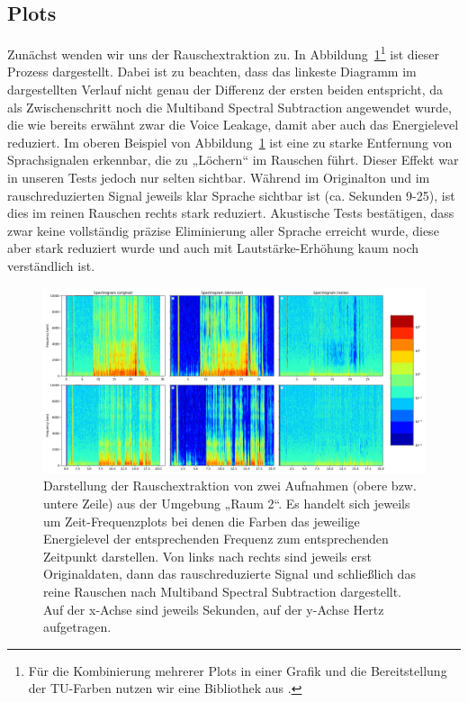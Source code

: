 \documentclass[
	fontsize=10.5pt,
	marginpar=false,
	ngerman,
	accentcolor=3d
	]{tudapub}
\begin{document}
\pagebreak
\subsection{Plots}
\label{plots}

Zunächst wenden wir uns der Rauschextraktion zu. In Abbildung~\ref{fig:denoise}\footnote{Für die Kombinierung mehrerer Plots in einer Grafik und die Bereitstellung der TU-Farben nutzen wir eine Bibliothek aus \cite{damken_fdamkenbachelors-thesis_code_2020}.} ist dieser Prozess dargestellt. Dabei ist zu beachten, dass das linkeste Diagramm im dargestellten Verlauf nicht genau der Differenz der ersten beiden entspricht, da als Zwischenschritt noch die Multiband Spectral Subtraction angewendet wurde, die wie bereits erwähnt zwar die Voice Leakage, damit aber auch das Energielevel reduziert. Im oberen Beispiel von Abbildung~\ref{fig:denoise} ist eine zu starke Entfernung von Sprachsignalen erkennbar, die zu „Löchern“ im Rauschen führt. Dieser Effekt war in unseren Tests jedoch nur selten sichtbar. Während im Originalton und im rauschreduzierten Signal jeweils klar Sprache sichtbar ist (ca. Sekunden 9-25), ist dies im reinen Rauschen rechts stark reduziert. Akustische Tests bestätigen, dass zwar keine vollständig präzise Eliminierung aller Sprache erreicht wurde, diese aber stark reduziert wurde und auch mit Lautstärke-Erhöhung kaum noch verständlich ist.

\begin{figure}[h]
	\centering
	\includegraphics[width=1.0\textwidth]{media/denoiser2mp}
	\caption{Darstellung der Rauschextraktion von zwei Aufnahmen (obere bzw. untere Zeile) aus der Umgebung „Raum 2“. Es handelt sich jeweils um Zeit-Frequenzplots bei denen die Farben das jeweilige Energielevel der entsprechenden Frequenz zum entsprechenden Zeitpunkt darstellen. Von links nach rechts sind jeweils erst Originaldaten, dann das rauschreduzierte Signal und schließlich das reine Rauschen nach Multiband Spectral Subtraction dargestellt. Auf der x-Achse sind jeweils Sekunden, auf der y-Achse Hertz aufgetragen.}
	\label{fig:denoise}
\end{figure}
\end{document}
